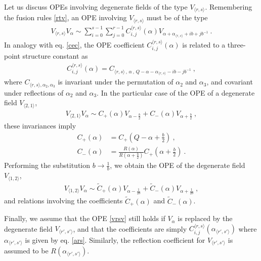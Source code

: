 \documentclass[12pt,a4paper,notitlepage]{report}
\numberwithin{equation}{section}
\theoremstyle{break}
\begin{document}
Let us discuss OPEs involving degenerate fields of the type $V_{\langle r,s \rangle}$.
Remembering the fusion rules \eqref{rtv}, an OPE involving $V_{\langle r,s \rangle}$ must be of the type
\begin{align}
 \boxed{V_{\langle r,s \rangle} V_\alpha \sim \sum_{i=0}^{s-1}\sum_{j=0}^{r-1} C_{i,j}^{\langle r,s \rangle}(\alpha) V_{\alpha+\alpha_{\langle r,s \rangle}+ib+jb^{-1}}}\ .
\label{vrsv}
\end{align}
In analogy with eq. \eqref{cec}, the OPE coefficient $C_{i,j}^{\langle r,s \rangle}(\alpha)$ is related to a three-point structure constant  as 
\begin{align}
 C_{i,j}^{\langle r,s \rangle}(\alpha) = C_{\langle r,s \rangle\, ,\, \alpha\, ,\, Q-\alpha-\alpha_{\langle r,s \rangle}-ib-jb^{-1}}\ , 
\end{align}
where $C_{\langle r,s \rangle, \alpha_2,\alpha_3}$ is invariant under the permutation of $\alpha_2$ and $\alpha_3$, and covariant under reflections of $\alpha_2$ and $\alpha_3$.
In the particular case of the OPE of a degenerate field $V_{\langle 2,1 \rangle}$,
\begin{align}
 \boxed{V_{\langle 2,1 \rangle} V_\alpha \sim C_+(\alpha) V_{\alpha-\frac{b}{2}} + C_-(\alpha) V_{\alpha+\frac{b}{2}}}\ ,
\label{vot}
\end{align}
 these invariances imply 
\begin{align}
 C_+(\alpha) &= C_+(Q-\alpha+\tfrac{b}{2})\ ,
\label{cpcp}
\\
C_-(\alpha) & = \frac{R(\alpha)}{R(\alpha+\tfrac{b}{2})} C_+(\alpha+\tfrac{b}{2})\ . 
\label{cmcp}
\end{align}
Performing the substitution $b\rightarrow \frac{1}{b}$, we obtain
the OPE of the degenerate field $V_{\langle 1,2 \rangle}$,
\begin{align}
\boxed{V_{\langle 1,2 \rangle} V_\alpha \sim \tilde{C}_+(\alpha) V_{\alpha-\frac{1}{2b}} + \tilde{C}_-(\alpha) V_{\alpha+\frac{1}{2b}}}\ ,
 \label{vto}
\end{align}
and relations involving the coefficients $\tilde{C}_+(\alpha)$ and $\tilde{C}_-(\alpha)$. 

Finally, we assume that the OPE \eqref{vrsv} still holds if $V_\alpha$ is replaced by the degenerate field $V_{\langle r',s'\rangle}$, and that the coefficients are simply $C_{i,j}^{\langle r,s \rangle}(\alpha_{\langle r',s'\rangle})$ where $\alpha_{\langle r',s'\rangle}$ is given by eq. \eqref{ars}. Similarly, the reflection coefficient for $V_{\langle r',s'\rangle}$ is assumed to be $R(\alpha_{\langle r',s'\rangle})$.
\end{document}
